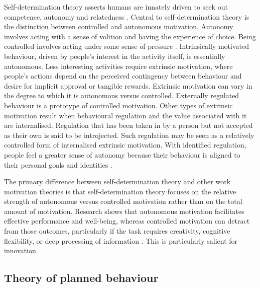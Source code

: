 Self-determination theory asserts humans are innately driven to seek out competence, autonomy and relatedness \citep{ryan2000self}. Central to self-determination theory is the distinction between controlled and autonomous motivation. Autonomy involves acting with a sense of volition and having the experience of choice. Being controlled involves acting under some sense of pressure \citep{gagne2005self}. Intrinsically motivated behaviour, driven by people’s interest in the activity itself, is essentially autonomous. Less interesting activities require extrinsic motivation, where people's actions depend on the perceived contingency between behaviour and desire for implicit approval or tangible rewards. Extrinsic motivation can vary in the degree to which it is autonomous versus controlled. Externally regulated behaviour is a prototype of controlled motivation. Other types of extrinsic motivation result when behavioural regulation and the value associated with it are internalised. Regulation that has been taken in by a person but not accepted as their own is said to be introjected. Such regulation may be seen as a relatively controlled form of internalised extrinsic motivation. With identified regulation, people feel a greater sense of autonomy because their behaviour is aligned to their personal goals and identities \citep{gagne2005self}. 

The primary difference between self-determination theory and other work motivation theories is that self-determination theory focuses on the relative strength of autonomous versus controlled motivation rather than on the total amount of motivation. Research shows that autonomous motivation facilitates effective performance and well-being, whereas controlled motivation can detract from those outcomes, particularly if the task requires creativity, cognitive flexibility, or deep processing of information \citep{gagne2005self}. This is particularly salient for innovation.


\subsection{Theory of planned behaviour}

